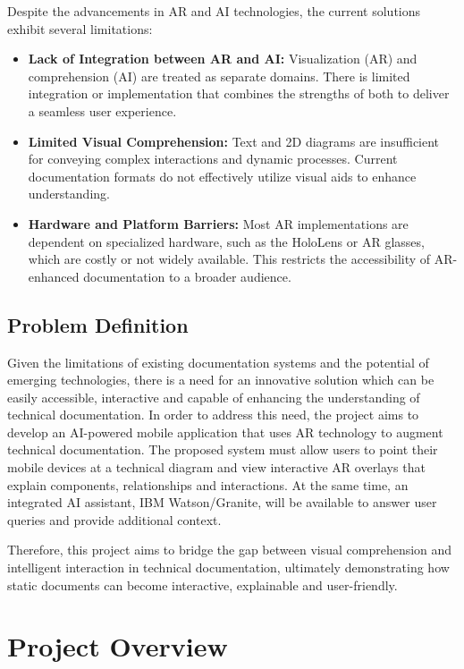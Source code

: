 \documentclass[12pt]{article}
\begin{document}
        Despite the advancements in AR and AI technologies, the current solutions exhibit several limitations:
        \begin{itemize}
            \item \textbf{Lack of Integration between AR and AI:}
                Visualization (AR) and comprehension (AI) are treated as separate domains. There is limited integration or implementation that combines the strengths of both to deliver a seamless user experience.
            \item \textbf{Limited Visual Comprehension:}
                Text and 2D diagrams are insufficient for conveying complex interactions and dynamic processes. Current documentation formats do not effectively utilize visual aids to enhance understanding.
            \item \textbf{Hardware and Platform Barriers:}
                Most AR implementations are dependent on specialized hardware, such as the HoloLens or AR glasses, which are costly or not widely available. This restricts the accessibility of AR-enhanced documentation to a broader audience.
        \end{itemize}

    \subsection{Problem Definition}

    Given the limitations of existing documentation systems and the potential of emerging technologies, there is a need for an innovative solution which can be easily accessible, interactive and capable of enhancing
    the understanding of technical documentation. In order to address this need, the project aims to develop an AI-powered mobile application that uses AR technology to augment technical documentation. The proposed system must 
    allow users to point their mobile devices at a technical diagram and view interactive AR overlays that explain components, relationships and interactions. At the same time, an integrated AI assistant, IBM Watson/Granite,
    will be available to answer user queries and provide additional context.  

    Therefore, this project aims to bridge the gap between visual comprehension and intelligent interaction in technical documentation, ultimately demonstrating how static documents can become interactive, explainable and user-friendly.


\section{Project Overview}
\end{document}
